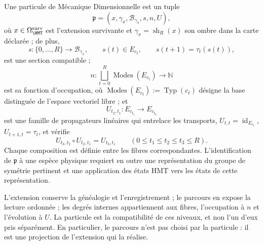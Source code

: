 \begin{definition}
Une particule de Mécanique Dimensionnelle est un tuple
\[
 \mathfrak p=(x,\gamma_x,\mathcal B_{\gamma_x},s,n,U),
\]
où \(x\in\Omega_{\HMT}^{\rm surv}\) est l’extension survivante et \(\gamma_x=\operatorname{sh}_R(x)\) son ombre dans la carte déclarée ; de plus,
\[
 s:\{0,\ldots,R\}\longrightarrow\mathcal B_{\gamma_x},\qquad
 s(t)\in E_{c_t},\qquad s(t+1)=\tau_t(s(t)),
\]
est une section compatible ;
\[
 n:\bigsqcup_{t=0}^{R}\operatorname{Modes}(E_{c_t})
 \longrightarrow\mathbb N
\]
est sa fonction d’occupation, où \(\operatorname{Modes}(E_{c_t}):=\operatorname{Typ}(c_t)\) désigne la base distinguée de l’espace vectoriel libre ; et
\[
 U_{t_2,t_1}:E_{c_{t_1}}\longrightarrow E_{c_{t_2}}
\]
est une famille de propagateurs linéaires qui entrelace les transports, \(U_{t,t}=\operatorname{id}_{E_{c_t}}\), \(U_{t+1,t}=\tau_t\), et vérifie
\[
 U_{t_3,t_2}\circ U_{t_2,t_1}=U_{t_3,t_1}
 \qquad(0\leq t_1\leq t_2\leq t_3\leq R).
\]
Chaque composition est définie entre les fibres correspondantes. L’identification de \(\mathfrak p\) à une espèce physique requiert en outre une représentation du groupe de symétrie pertinent et une application des états HMT vers les états de cette représentation.
\end{definition}

L’extension conserve la généalogie et l’enregistrement ; le parcours en expose la lecture ordonnée ; les degrés internes appartiennent aux fibres, l’occupation à \(n\) et l’évolution à \(U\). La particule est la compatibilité de ces niveaux, et non l’un d’eux pris séparément. En particulier, le parcours n’est pas choisi par la particule : il est une projection de l’extension qui la réalise.
